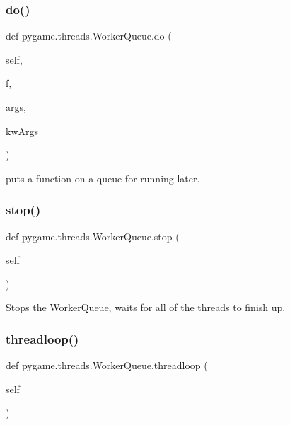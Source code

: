 \subsubsection{\texorpdfstring{do()}{do()}}
{\footnotesize\ttfamily def pygame.\+threads.\+Worker\+Queue.\+do (\begin{DoxyParamCaption}\item[{}]{self,  }\item[{}]{f,  }\item[{}]{args,  }\item[{}]{kw\+Args }\end{DoxyParamCaption})}

\begin{DoxyVerb}puts a function on a queue for running later.
\end{DoxyVerb}
 \mbox{\label{classpygame_1_1threads_1_1_worker_queue_af53360f5b25ccabae9fda06bf2fc624d}} 
\subsubsection{\texorpdfstring{stop()}{stop()}}
{\footnotesize\ttfamily def pygame.\+threads.\+Worker\+Queue.\+stop (\begin{DoxyParamCaption}\item[{}]{self }\end{DoxyParamCaption})}

\begin{DoxyVerb}Stops the WorkerQueue, waits for all of the threads to finish up.
\end{DoxyVerb}
 \mbox{\label{classpygame_1_1threads_1_1_worker_queue_ab7bdb3c20aea724ab68d5dc1319d24d2}} 
\subsubsection{\texorpdfstring{threadloop()}{threadloop()}}
{\footnotesize\ttfamily def pygame.\+threads.\+Worker\+Queue.\+threadloop (\begin{DoxyParamCaption}\item[{}]{self }\end{DoxyParamCaption})}

